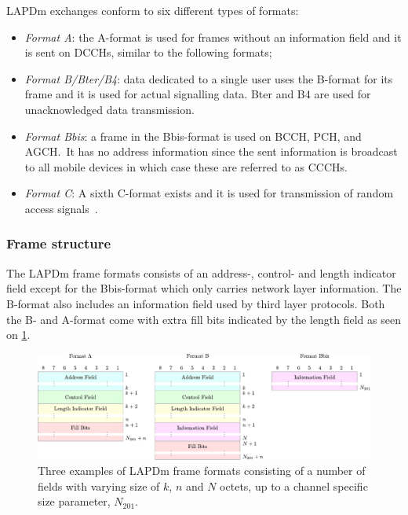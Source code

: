 \gls{LAPDm} exchanges conform to six different types of formats:
\begin{itemize}
\item \textit{Format A}: the A-format is used for frames without an
  information field and it is sent on \glspl{DCCH}, similar to the
  following formats;
\item \textit{Format B/Bter/B4}: data dedicated to a single user uses
  the B-format for its frame and it is used for actual signalling
  data. Bter and B4 are used for unacknowledged data transmission.
\item \textit{Format Bbis}: a frame in the Bbis-format is used on
  \gls{BCCH}, \gls{PCH}, and \gls{AGCH}.\ It has no address
  information since the sent information is broadcast to all mobile
  devices in which case these are referred to as \glspl{CCCH}.
\item \textit{Format C}: A sixth C-format exists and it is used for
  transmission of random access signals~\cite[p. 9--12]{layer2}.
\end{itemize}

\subsubsection{Frame structure}
The \gls{LAPDm} frame formats consists of an address-, control- and
length indicator field except for the Bbis-format which only carries
network layer information. The B-format also includes an information
field used by third layer protocols. Both the B- and A-format come
with extra fill bits indicated by the length field as seen on
\cref{fig:lapdm_frame}.

\begin{figure}[H]
  \centering
  \includegraphics[width=\textwidth]{figures/lapdm}
  \caption{Three examples of LAPDm frame formats consisting of a number of
    fields with varying size of $k$, $n$ and $N$ octets, up to a
    channel specific size parameter, $N_{201}$.}
  \label{fig:lapdm_frame}
\end{figure}

